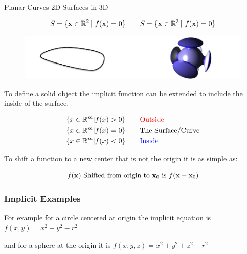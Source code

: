 \documentclass{article}
\begin{document}
\begin{center}
    Planar Curves 2D \hspace{50px} Surfaces in 3D

    \vspace{-10px}

    \[
        S = \{\text{\textbf{x}} \in \mathbb{R}^2 \, |\  f(\text{\textbf{x}}) = 0\} \qquad
        S = \{\text{\textbf{x}} \in \mathbb{R}^3 \, |\  f(\text{\textbf{x}}) = 0\}
    \]
\end{center}

\vspace{-10px}

\begin{figure}[!ht]
    \centering
    \includegraphics[width=0.5\linewidth]{images/planar_vs_surfaces.png}
\end{figure}


To define a solid object the implicit function can be extended to include the inside of the surface.

\begin{align*}
    \{ x & \in \mathbb{R}^m | f(x) > 0\} \qquad \text{\textcolor{red}{Outside}}\\
    \{ x & \in \mathbb{R}^m | f(x) = 0\} \qquad \text{The Surface/Curve}\\
    \{ x & \in \mathbb{R}^m | f(x) < 0\} \qquad \text{\textcolor{blue}{Inside}}\\
\end{align*}


\newpage

To shift a function to a new center that is not the origin it is as simple as:

\[
    f(\text{\textbf{x}}) \ \text{Shifted from origin to } \text{\textbf{x}}_0 \text{ is } 
    f(\text{\textbf{x}}-\text{\textbf{x}}_0)
\]


\vspace{15px}

\subsubsection{Implicit Examples}

For example for a circle centered at origin the implicit equation is  \(f(x,y) = x^2 + y^2 - r^2\) 

and for a sphere at the origin it is \(f(x,y,z) = x^2 + y^2 + z^2 - r^2\)
\end{document}
